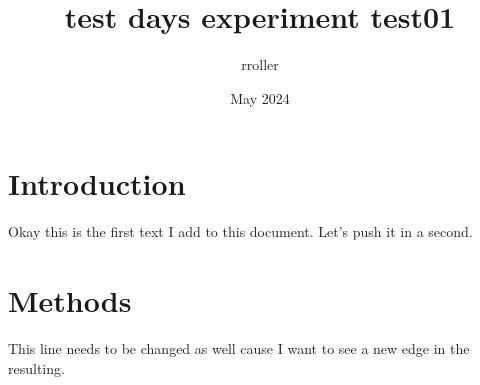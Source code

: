 \documentclass{article}
\title{test days experiment test01}
\author{rroller }
\date{May 2024}
\begin{document}
\maketitle

\section{Introduction}
Okay this is the first text I add to this document. Let's push it in a second.


\section{Methods}
This line needs to be changed as well cause I want to see a new edge in the resulting.
\end{document}

